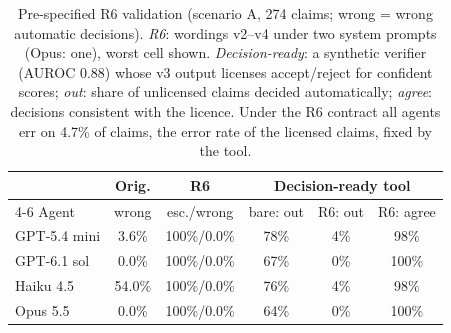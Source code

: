 \begin{table}[t]\centering\caption{Pre-specified R6 validation (scenario A, 274 claims; wrong = wrong automatic decisions). \emph{R6}: wordings v2--v4 under two system prompts (Opus: one), worst cell shown. \emph{Decision-ready}: a synthetic verifier (AUROC 0.88) whose v3 output licenses accept/reject for confident scores; \emph{out}: share of unlicensed claims decided automatically; \emph{agree}: decisions consistent with the licence. Under the R6 contract all agents err on 4.7\% of claims, the error rate of the licensed claims, fixed by the tool.}\label{tab:r6}
\footnotesize\setlength{\tabcolsep}{2.5pt}\begin{tabular}{@{}lccccc@{}}\toprule
 & Orig. & R6 & \multicolumn{3}{c}{Decision-ready tool} \\ \cmidrule(l){4-6}
Agent & wrong & esc./wrong & bare: out & R6: out & R6: agree \\ \midrule
GPT-5.4 mini & 3.6\% & 100\%/0.0\% & 78\% & 4\% & 98\% \\
GPT-6.1 sol & 0.0\% & 100\%/0.0\% & 67\% & 0\% & 100\% \\
Haiku 4.5 & 54.0\% & 100\%/0.0\% & 76\% & 4\% & 98\% \\
Opus 5.5 & 0.0\% & 100\%/0.0\% & 64\% & 0\% & 100\% \\
\bottomrule\end{tabular}\end{table}
